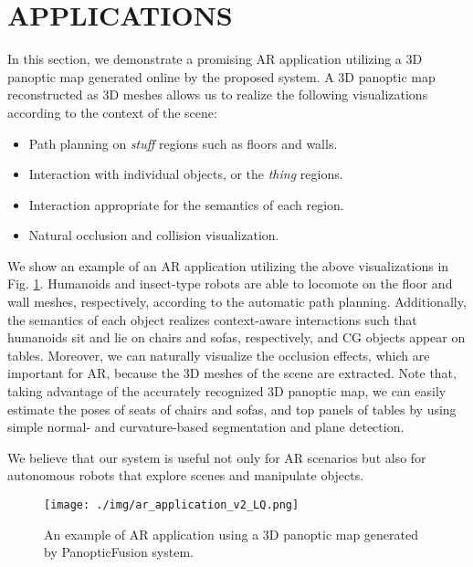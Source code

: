 \documentclass[letterpaper, 10pt, conference]{latex_template/ieeeconf}
\begin{document}
\section{APPLICATIONS}
In this section, we demonstrate a promising AR application utilizing a 3D panoptic map generated online by the proposed system.
A 3D panoptic map reconstructed as 3D meshes allows us to realize the following visualizations according to the context of the scene:
\begin{itemize}
   \item Path planning on {\it stuff} regions such as floors and walls.
   \item Interaction with individual objects, or the {\it thing} regions.
   \item Interaction appropriate for the semantics of each region.
   \item Natural occlusion and collision visualization.
\end{itemize} 
We show an example of an AR application utilizing the above visualizations in Fig. \ref{fig_ar_application}. 
Humanoids and insect-type robots are able to locomote on the floor and wall meshes, respectively, according to the automatic path planning.
Additionally, the semantics of each object realizes context-aware interactions such that humanoids sit and lie on chairs and sofas, respectively, and CG objects appear on tables.
Moreover, we can naturally visualize the occlusion effects, which are important for AR, because the 3D meshes of the scene are extracted.
Note that, taking advantage of the accurately recognized 3D panoptic map, we can easily estimate the poses of seats of chairs and sofas, and top panels of tables by using simple normal- and curvature-based segmentation and plane detection.

We believe that our system is useful not only for AR scenarios but also for autonomous robots that explore scenes and manipulate objects.

\begin{figure}[t]
   \centering
      \texttt{[image: ./img/ar\_application\_v2\_LQ.png]}
      \caption{An example of AR application using a 3D panoptic map generated by PanopticFusion system.}
      \label{fig_ar_application}
\end{figure}
\end{document}
